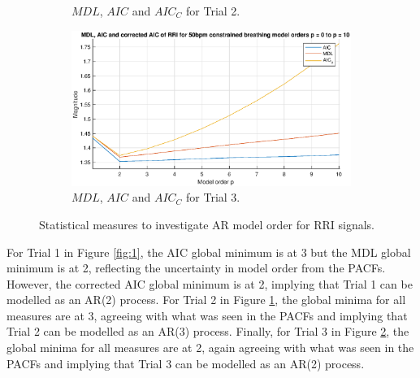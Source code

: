 \begin{figure}[H]
\begin{center}
\begin{subfigure}{0.31\textwidth}
  \caption{$MDL$, $AIC$ and $AIC_{C}$ for Trial 2.}
  \label{fig:2}
\end{subfigure}
\begin{subfigure}{0.31\textwidth}
  \includegraphics[width=\linewidth]{assignment2figs/mdl_aic_50.eps}
  \caption{$MDL$, $AIC$ and $AIC_{C}$ for Trial 3.}
    \label{fig:3}
\end{subfigure}
\caption{Statistical measures to investigate AR model order for RRI signals.}
\label{fig:HRmorestuff}
\end{center}
\end{figure}

\noindent
For Trial 1 in Figure \ref{fig:1}, the AIC global minimum is at 3 but the MDL global minimum is at 2, reflecting the uncertainty in model order from the PACFs. However, the corrected AIC global minimum is at 2, implying that Trial 1 can be modelled as an AR(2) process. For Trial 2 in Figure \ref{fig:2}, the global minima for all measures are at 3, agreeing with what was seen in the PACFs and implying that Trial 2 can be modelled as an AR(3) process. Finally, for Trial 3 in Figure \ref{fig:3}, the global minima for all measures are at 2, again agreeing with what was seen in the PACFs and implying that Trial 3 can be modelled as an AR(2) process.